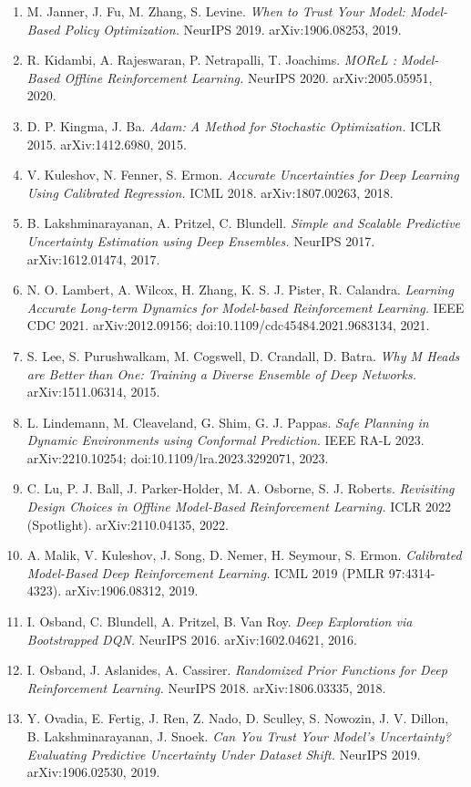 \documentclass[10pt]{article}
\begin{document}
\begin{enumerate}
\item M. Janner, J. Fu, M. Zhang, S. Levine. \emph{When to Trust Your Model: Model-Based Policy Optimization.} NeurIPS 2019. arXiv:1906.08253, 2019.
\item R. Kidambi, A. Rajeswaran, P. Netrapalli, T. Joachims. \emph{MOReL : Model-Based Offline Reinforcement Learning.} NeurIPS 2020. arXiv:2005.05951, 2020.
\item D. P. Kingma, J. Ba. \emph{Adam: A Method for Stochastic Optimization.} ICLR 2015. arXiv:1412.6980, 2015.
\item V. Kuleshov, N. Fenner, S. Ermon. \emph{Accurate Uncertainties for Deep Learning Using Calibrated Regression.} ICML 2018. arXiv:1807.00263, 2018.
\item B. Lakshminarayanan, A. Pritzel, C. Blundell. \emph{Simple and Scalable Predictive Uncertainty Estimation using Deep Ensembles.} NeurIPS 2017. arXiv:1612.01474, 2017.
\item N. O. Lambert, A. Wilcox, H. Zhang, K. S. J. Pister, R. Calandra. \emph{Learning Accurate Long-term Dynamics for Model-based Reinforcement Learning.} IEEE CDC 2021. arXiv:2012.09156; doi:10.1109/cdc45484.2021.9683134, 2021.
\item S. Lee, S. Purushwalkam, M. Cogswell, D. Crandall, D. Batra. \emph{Why M Heads are Better than One: Training a Diverse Ensemble of Deep Networks.} arXiv:1511.06314, 2015.
\item L. Lindemann, M. Cleaveland, G. Shim, G. J. Pappas. \emph{Safe Planning in Dynamic Environments using Conformal Prediction.} IEEE RA-L 2023. arXiv:2210.10254; doi:10.1109/lra.2023.3292071, 2023.
\item C. Lu, P. J. Ball, J. Parker-Holder, M. A. Osborne, S. J. Roberts. \emph{Revisiting Design Choices in Offline Model-Based Reinforcement Learning.} ICLR 2022 (Spotlight). arXiv:2110.04135, 2022.
\item A. Malik, V. Kuleshov, J. Song, D. Nemer, H. Seymour, S. Ermon. \emph{Calibrated Model-Based Deep Reinforcement Learning.} ICML 2019 (PMLR 97:4314-4323). arXiv:1906.08312, 2019.
\item I. Osband, C. Blundell, A. Pritzel, B. Van Roy. \emph{Deep Exploration via Bootstrapped DQN.} NeurIPS 2016. arXiv:1602.04621, 2016.
\item I. Osband, J. Aslanides, A. Cassirer. \emph{Randomized Prior Functions for Deep Reinforcement Learning.} NeurIPS 2018. arXiv:1806.03335, 2018.
\item Y. Ovadia, E. Fertig, J. Ren, Z. Nado, D. Sculley, S. Nowozin, J. V. Dillon, B. Lakshminarayanan, J. Snoek. \emph{Can You Trust Your Model's Uncertainty? Evaluating Predictive Uncertainty Under Dataset Shift.} NeurIPS 2019. arXiv:1906.02530, 2019.

\end{enumerate}
\end{document}
